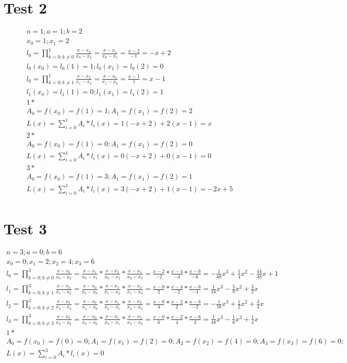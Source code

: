\documentclass[12pt,a4paper]{article}
\theoremstyle{definition}
\begin{document}
\section{Test 2}
\begin{displaymath} 
\begin{split}
n=1; a=1; b=2\\
x_0=1; x_1=2\\
l_0=\prod\limits_{k=0;k\neq0}^1\frac{x-x_k}{x_0-x_k}=\frac{x-x_1}{x_0-x_1}=\frac{x-2}{-1}=-x+2\\
l_0(x_0)=l_0(1)=1; l_0(x_1)=l_0(2)=0\\
l_0=\prod\limits_{k=0;k\neq1}^1\frac{x-x_k}{x_1-x_k}=\frac{x-x_0}{x_1-x_0}=\frac{x-1}{1}=x-1\\
l_1(x_0)=l_1(1)=0; l_1(x_1)=l_1(2)=1\\
1*\\
A_0=f(x_0)=f(1)=1; A_1=f(x_1)=f(2)=2\\
L(x)=\sum\limits_{i=0}^1A_i*l_i(x)=1(-x+2)+2(x-1)=x\\
2*\\
A_0=f(x_0)=f(1)=0; A_1=f(x_1)=f(2)=0\\
L(x)=\sum\limits_{i=0}^1A_i*l_i(x)=0(-x+2)+0(x-1)=0\\
3*\\
A_0=f(x_0)=f(1)=3; A_1=f(x_1)=f(2)=1\\
L(x)=\sum\limits_{i=0}^1A_i*l_i(x)=3(-x+2)+1(x-1)=-2x+5\\
\end{split}
\end{displaymath}
\section{Test 3}
\begin{displaymath} 
\begin{split}
n=3; a=0; b=6\\
x_0=0; x_1=2; x_2=4; x_3=6\\
l_0=\prod\limits_{k=0;k\neq0}^3\frac{x-x_k}{x_0-x_k}=\frac{x-x_1}{x_0-x_1}*\frac{x-x_2}{x_0-x_2}*\frac{x-x_3}{x_0-x_3}=\frac{x-2}{-2}*\frac{x-4}{-4}*\frac{x-6}{-6}=-\frac{1}{48}x^3+\frac{1}{4}x^2-\frac{44}{48}x+1\\
l_1=\prod\limits_{k=0;k\neq1}^3\frac{x-x_k}{x_1-x_k}=\frac{x-x_0}{x_1-x_0}*\frac{x-x_2}{x_1-x_2}*\frac{x-x_3}{x_1-x_3}=\frac{x-0}{2}*\frac{x-4}{-2}*\frac{x-6}{-4}=\frac{1}{16}x^3-\frac{5}{8}x^2+\frac{3}{2}x\\
l_2=\prod\limits_{k=0;k\neq2}^3\frac{x-x_k}{x_2-x_k}=\frac{x-x_0}{x_2-x_0}*\frac{x-x_1}{x_2-x_1}*\frac{x-x_3}{x_2-x_3}=\frac{x-0}{4}*\frac{x-2}{2}*\frac{x-6}{-2}=-\frac{1}{16}x^3+\frac{1}{2}x^2+\frac{3}{4}x\\
l_3=\prod\limits_{k=0;k\neq3}^3\frac{x-x_k}{x_3-x_k}=\frac{x-x_0}{x_3-x_0}*\frac{x-x_1}{x_3-x_1}*\frac{x-x_2}{x_3-x_2}=\frac{x-0}{6}*\frac{x-2}{4}*\frac{x-6}{2}=\frac{1}{48}x^3-\frac{1}{6}x^2+\frac{1}{4}x\\
1*\\
A_0=f(x_0)=f(0)=0; A_1=f(x_1)=f(2)=0; A_2=f(x_2)=f(4)=0; A_3=f(x_3)=f(6)=0; \\
L(x)=\sum\limits_{i=0}^3A_i*l_i(x)=0\\
\end{split}
\end{displaymath}
\end{document}
